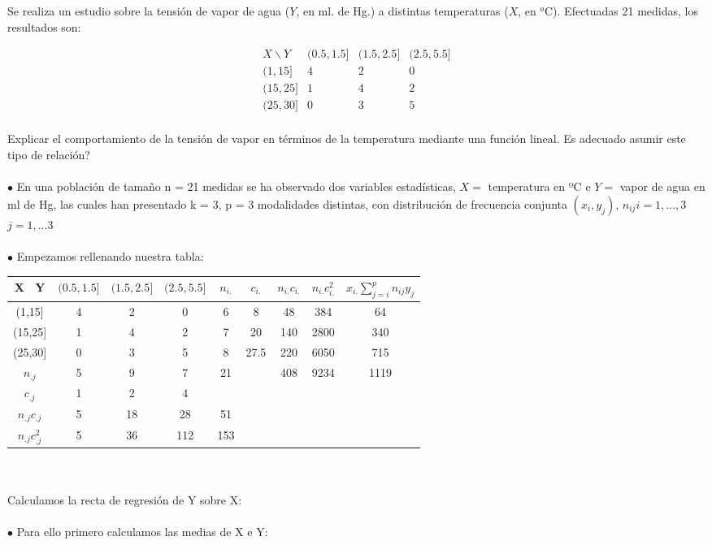 \problem

Se realiza un estudio sobre la tensión de vapor de agua
($Y$, en ml. de Hg.) a distintas temperaturas ($X$, en ${}^o$C). Efectuadas 21
medidas, los resultados son:

$$
\begin{array}{c|ccc}
	X \backslash Y &  (0\mbox{.}5,1\mbox{.}5] & (1\mbox{.}5,2\mbox{.}5] & (2\mbox{.}5,5\mbox{.}5] \\ \hline
	(1,15] &     4    &   2     &  0      \\
	(15,25] &     1    &   4     &  2      \\
	(25,30] &     0    &   3     &  5      \\
\end{array}
$$

Explicar el comportamiento de la tensión de vapor  en términos de la temperatura  mediante una función lineal. Es adecuado asumir este tipo de relación?\\ \\
	$\bullet$ En una población de tamaño n = 21 medidas se ha observado dos variables
	estadísticas, $X =$ temperatura en ºC e $Y =$ vapor de agua en ml de Hg, las
	cuales han presentado k = 3, p = 3 modalidades distintas, con distribución de
	frecuencia conjunta $(x_{i},y_{j})$, $n_{ij} i = 1,...,3$ $ j=1,...3$\\ \\
	$\bullet$ Empezamos rellenando nuestra tabla: \\
	
		\begin{tabular}{ | c | c | c | c | c | c | c | c| c| }
		
		
		\hline	
		X \ Y & $(0.5,1.5]$ & $(1.5,2.5]$ & $(2.5,5.5]$ & $n_{i.}$& $c_{i.}$& $n_{i.}c_{i.}$ &  $n_{i.}c_{i.}^{2}$ & $x_{i.}\sum_{j=i}^{p}n_{ij}y_{j}$ \\ \hline
		(1,15] & 4 & 2  & 0 & 6 & 8 & 48& 384 & 64 \\
		(15,25] & 1 & 4 & 2 & 7& 20 & 140 & 2800 & 340 \\
		(25,30] & 0 & 3 & 5 & 8 & 27.5 & 220 & 6050 & 715 \\
		$n_{.j}$& 5 & 9  & 7 & 21 & & 408 & 9234 & 1119 \\ 
		$c_{.j}$& 1 & 2  & 4  &  & & & &\\
		$n_{.j}c_{.j}$ & 5 & 18 & 28 & 51 & & & &  \\
		$n_{.j}c_{.j}^{2}$& 5 & 36 & 112 & 153 & & & & \\\hline
		
		
	\end{tabular}
\\ \\
\subproblem
	Calculamos la recta de regresión de Y sobre X:\\
	\\
	$\bullet$  Para ello primero calculamos las medias de X e Y: \\
	
